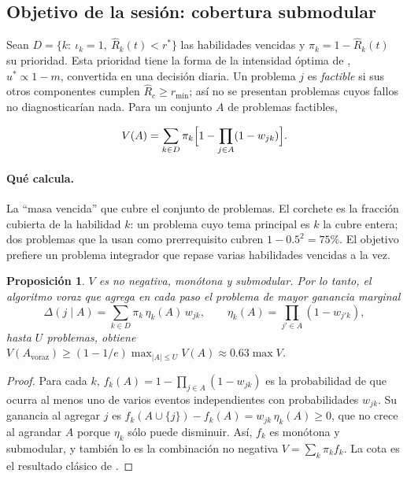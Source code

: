 \documentclass[11pt]{article}
\newtheorem{proposicion}{Proposición}
\theoremstyle{definition}
\theoremstyle{remark}
\newcommand{\Rh}{\hat R}
\newcommand{\rstar}{r^{\ast}}
\begin{document}
\subsection{Objetivo de la sesión: cobertura submodular}
\label{sec:planificador}

Sean $D=\{k:\ \iota_k=1,\ \Rh_k(t)<\rstar\}$ las habilidades vencidas y $\pi_k=1-\Rh_k(t)$ su prioridad. Esta prioridad tiene la forma de la intensidad óptima de \citet{tabibian2019}, $u^\ast\propto1-m$, convertida en una decisión diaria. Un problema $j$ es \emph{factible} si sus otros componentes cumplen $\Rh_c\ge r_{\min}$; así no se presentan problemas cuyos fallos no diagnosticarían nada. Para un conjunto $A$ de problemas factibles,

\begin{equation}
V(A)=\sum_{k\in D}\pi_k\Bigl[1-\prod_{j\in A}(1-w_{jk})\Bigr].
\label{eq:cobertura}
\end{equation}

\paragraph{Qué calcula.} La ``masa vencida'' que cubre el conjunto de problemas. El corchete es la fracción cubierta de la habilidad $k$: un problema cuyo tema principal es $k$ la cubre entera; dos problemas que la usan como prerrequisito cubren $1-0.5^2=75\%$. El objetivo prefiere un problema integrador que repase varias habilidades vencidas a la vez.

\begin{proposicion}
\label{prop:submod}
$V$ es no negativa, monótona y submodular. Por lo tanto, el algoritmo voraz que agrega en cada paso el problema de mayor ganancia marginal
\begin{equation}
\Delta(j\mid A)=\sum_{k\in D}\pi_k\,\eta_k(A)\,w_{jk},\qquad \eta_k(A)=\prod_{j'\in A}(1-w_{j'k}),
\label{eq:ganancia}
\end{equation}
hasta $U$ problemas, obtiene $V(A_{\mathrm{voraz}})\ge(1-1/e)\max_{|A|\le U}V(A)\approx0.63\max V$.
\end{proposicion}
\begin{proof}
Para cada $k$, $f_k(A)=1-\prod_{j\in A}(1-w_{jk})$ es la probabilidad de que ocurra al menos uno de varios eventos independientes con probabilidades $w_{jk}$. Su ganancia al agregar $j$ es $f_k(A\cup\{j\})-f_k(A)=w_{jk}\,\eta_k(A)\ge0$, que no crece al agrandar $A$ porque $\eta_k$ sólo puede disminuir. Así, $f_k$ es monótona y submodular, y también lo es la combinación no negativa $V=\sum_k\pi_kf_k$. La cota es el resultado clásico de \citet{nemhauser1978}.
\end{proof}
\end{document}
